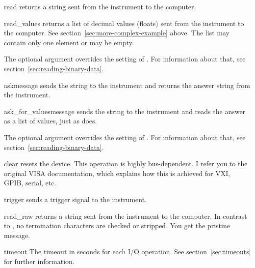 \documentclass{howto}
\begin{document}
\begin{methoddesc}{read}{}
  returns a string sent from the instrument to the computer.
\end{methoddesc}

\begin{methoddesc}{read_values}{}
  returns a list of decimal values (floats) sent from the instrument to the
  computer.  See section~\ref{sec:more-complex-example} above.  The list may
  contain only one element or may be empty.

  The optional  argument overrides the setting of
  .  For information about that, see
  section~\ref{sec:reading-binary-data}.
\end{methoddesc}

\begin{methoddesc}{ask}{message}
  sends the string  to the instrument and returns the answer
  string from the instrument.
\end{methoddesc}

\begin{methoddesc}{ask_for_values}{message}
  sends the string  to the instrument and reads the answer as a
  list of values, just as  does.

  The optional  argument overrides the setting of
  .  For information about that, see
  section~\ref{sec:reading-binary-data}.
\end{methoddesc}

\begin{methoddesc}{clear}{}
  resets the device.  This operation is highly bus-dependent.  I refer you to
  the original VISA documentation, which explains how this is achieved for VXI,
  GPIB, serial, etc.
\end{methoddesc}

\begin{methoddesc}{trigger}{}
  sends a trigger signal to the instrument.
\end{methoddesc}

\begin{methoddesc}{read_raw}{}
  returns a string sent from the instrument to the computer.  In contrast to
  , no termination characters are checked or stripped.  You get
  the pristine message.
\end{methoddesc}

\begin{memberdesc}{timeout}
  The timeout in seconds for each I/O operation.  See
  section~\ref{sec:timeouts} for further information.
\end{memberdesc}
\end{document}
